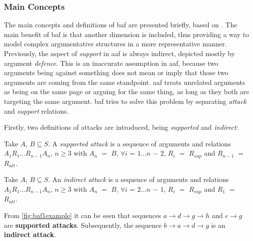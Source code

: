         
        
        \subsubsection{Main Concepts}
            The main concepts and definitions of \gls{baf} are presented briefly, based on \autocite{Cayrol2005OnTA}. The main benefit of \gls{baf} is that another dimension is included, thus providing a way to model complex argumentative structures in a more representative manner. Previously, the aspect of \textit{support} in \gls{aaf} is always indirect, depicted mostly by argument \textit{defence}. This is an inaccurate assumption in \gls{aaf}, because two arguments being against something does not mean or imply that those two arguments are coming from the same standpoint. \gls{aaf} treats unrelated arguments as being on the same page or arguing for the same thing, as long as they both are targeting the same argument. \gls{baf} tries to solve this problem by separating \textit{attack} and \textit{support} relations.
            
            Firstly, two definitions of attacks are introduced, being \textit{supported} and \textit{indirect}:
            
            \begin{definition}
                Take $A$, $B \subseteq S$. A \textit{supported attack} is a sequence of arguments and relations $A_{1} R_{1} \ldots R_{n - 1} A_{n}$, $n \geq 3$ with $A_{n}$ $=$ $B$, $\forall i$ = $1 \ldots n$ $-$ $2$, $R_{i}$ $=$ $R_{sup}$ and $R_{n - 1}$ $=$ $R_{att}$.
                \label{definition:definition11}
            \end{definition}
            
            \begin{definition}
                Take $A$, $B \subseteq S$. An \textit{indirect attack} is a sequence of arguments and relations $A_{1} R_{1} \ldots R_{n - 1} A_{n}$, $n \geq 3$ with $A_{n}$ $=$ $B$, $\forall i$ = $2 \ldots n$ $-$ $1$, $R_{i}$ $=$ $R_{sup}$ and $R_{1}$ $=$ $R_{att}$.
                \label{definition:definition12}
            \end{definition}
            
            \begin{exa}
                From \autoref{fig:baf1example} it can be seen that sequences $a \rightarrow d \rightarrow g \rightarrow h$ and $e \rightarrow g$ are \textbf{supported attacks}. Subsequently, the sequence $b \rightarrow a \rightarrow d \rightarrow g$ is an \textbf{indirect attack}.
                \label{exa:example11}
            \end{exa}
            
